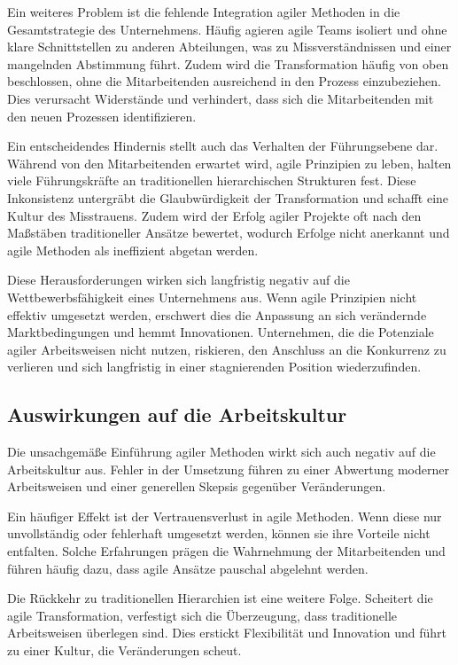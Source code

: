\documentclass[ngerman]{seminarvorlage}
\begin{document}
Ein weiteres Problem ist die fehlende Integration agiler Methoden in die Gesamtstrategie des Unternehmens. Häufig agieren agile Teams isoliert und ohne klare Schnittstellen zu anderen Abteilungen, was zu Missverständnissen und einer mangelnden Abstimmung führt. Zudem wird die Transformation häufig von oben beschlossen, ohne die Mitarbeitenden ausreichend in den Prozess einzubeziehen. Dies verursacht Widerstände und verhindert, dass sich die Mitarbeitenden mit den neuen Prozessen identifizieren.

Ein entscheidendes Hindernis stellt auch das Verhalten der Führungsebene dar. Während von den Mitarbeitenden erwartet wird, agile Prinzipien zu leben, halten viele Führungskräfte an traditionellen hierarchischen Strukturen fest. Diese Inkonsistenz untergräbt die Glaubwürdigkeit der Transformation und schafft eine Kultur des Misstrauens. Zudem wird der Erfolg agiler Projekte oft nach den Maßstäben traditioneller Ansätze bewertet, wodurch Erfolge nicht anerkannt und agile Methoden als ineffizient abgetan werden.

Diese Herausforderungen wirken sich langfristig negativ auf die Wettbewerbsfähigkeit eines Unternehmens aus. Wenn agile Prinzipien nicht effektiv umgesetzt werden, erschwert dies die Anpassung an sich verändernde Marktbedingungen und hemmt Innovationen. Unternehmen, die die Potenziale agiler Arbeitsweisen nicht nutzen, riskieren, den Anschluss an die Konkurrenz zu verlieren und sich langfristig in einer stagnierenden Position wiederzufinden.
\cite{online_chef_2022}

\subsection{Auswirkungen auf die Arbeitskultur}
Die unsachgemäße Einführung agiler Methoden wirkt sich auch negativ auf die Arbeitskultur aus. Fehler in der Umsetzung führen zu einer Abwertung moderner Arbeitsweisen und einer generellen Skepsis gegenüber Veränderungen.

Ein häufiger Effekt ist der Vertrauensverlust in agile Methoden. Wenn diese nur unvollständig oder fehlerhaft umgesetzt werden, können sie ihre Vorteile nicht entfalten. Solche Erfahrungen prägen die Wahrnehmung der Mitarbeitenden und führen häufig dazu, dass agile Ansätze pauschal abgelehnt werden.

Die Rückkehr zu traditionellen Hierarchien ist eine weitere Folge. Scheitert die agile Transformation, verfestigt sich die Überzeugung, dass traditionelle Arbeitsweisen überlegen sind. Dies erstickt Flexibilität und Innovation und führt zu einer Kultur, die Veränderungen scheut.
\end{document}
